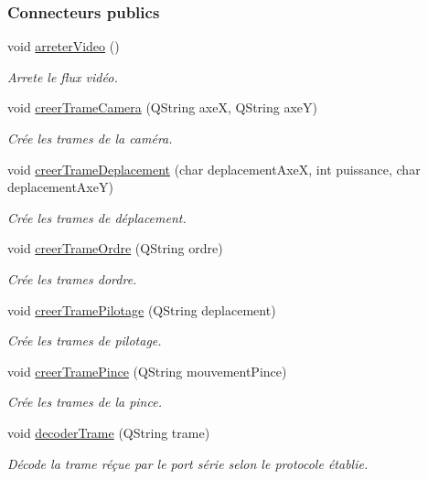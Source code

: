 \subsubsection*{Connecteurs publics}
\begin{DoxyCompactItemize}
\item 
void \hyperlink{class_rov_a241368439666a2549faff42931d82dfb}{arreter\+Video} ()
\begin{DoxyCompactList}\small\item\em Arrete le flux vidéo. \end{DoxyCompactList}\item 
void \hyperlink{class_rov_a204b1f4efe5a89f4458d84e17858e7c8}{creer\+Trame\+Camera} (Q\+String axeX, Q\+String axeY)
\begin{DoxyCompactList}\small\item\em Crée les trames de la caméra. \end{DoxyCompactList}\item 
void \hyperlink{class_rov_aa264d0723f6b491425ac2f85b933bab2}{creer\+Trame\+Deplacement} (char deplacement\+AxeX, int puissance, char deplacement\+AxeY)
\begin{DoxyCompactList}\small\item\em Crée les trames de déplacement. \end{DoxyCompactList}\item 
void \hyperlink{class_rov_a9e80eccfada890561e8af1f3426f6a2b}{creer\+Trame\+Ordre} (Q\+String ordre)
\begin{DoxyCompactList}\small\item\em Crée les trames d\textquotesingle{}ordre. \end{DoxyCompactList}\item 
void \hyperlink{class_rov_a97be62676ab0d57d5a8ac498147905ec}{creer\+Trame\+Pilotage} (Q\+String deplacement)
\begin{DoxyCompactList}\small\item\em Crée les trames de pilotage. \end{DoxyCompactList}\item 
void \hyperlink{class_rov_a66be7f6ff6e20da160d55e0cd0605965}{creer\+Trame\+Pince} (Q\+String mouvement\+Pince)
\begin{DoxyCompactList}\small\item\em Crée les trames de la pince. \end{DoxyCompactList}\item 
void \hyperlink{class_rov_ad818ff6ee1210ae44a24106b2bbbee7d}{decoder\+Trame} (Q\+String trame)
\begin{DoxyCompactList}\small\item\em Décode la trame réçue par le port série selon le protocole établie. \end{DoxyCompactList}\end{DoxyCompactItemize}
